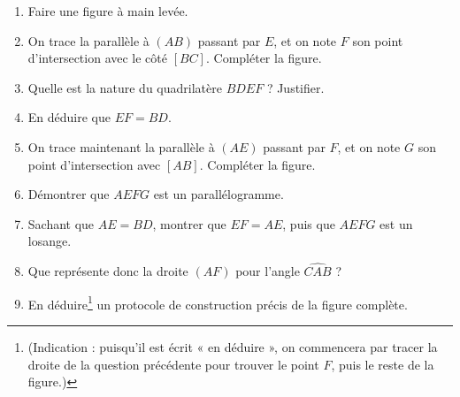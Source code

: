 \documentclass[12 pt]{extarticle}
\theoremstyle{plain}
\begin{document}
\begin{enumerate}
\item Faire une figure à main levée.

\item On trace la parallèle à $(AB)$ passant par $E$, et on note $F$ son point d'intersection avec le côté $[BC]$. 
Compléter la figure. 

\item Quelle est la nature du quadrilatère $BDEF$ ? Justifier. 

\item En déduire que $EF=BD$. 

\item On trace maintenant la parallèle à $(AE)$ passant par $F$, et on note $G$ son point d'intersection avec $[AB]$. Compléter la figure.

\item Démontrer que $AEFG$ est un parallélogramme. 

\item Sachant que $AE=BD$, montrer que $EF = AE$, puis que $AEFG$ est un losange. 

\item Que représente donc la droite $(AF)$ pour l'angle $\widehat{CAB}$ ? 

\item En déduire\footnote{(Indication : puisqu'il est écrit « en déduire », on commencera par tracer la droite de la question précédente pour trouver le point $F$, puis le reste de la figure.)} un protocole de construction précis de la figure complète.

\end{enumerate}
 
 	
\end{document}
